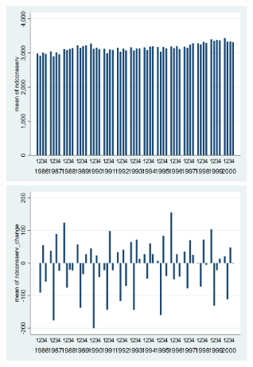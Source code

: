 \documentclass[12pt,a4paper]{article}
\begin{document}
\begin{center}
\includegraphics[width=8cm]{graphs/ndconsserv_quarterly.png}
\includegraphics[width=8cm]{graphs/ndconsserv_change_quarterly.png}\\

\end{center}
\end{document}
